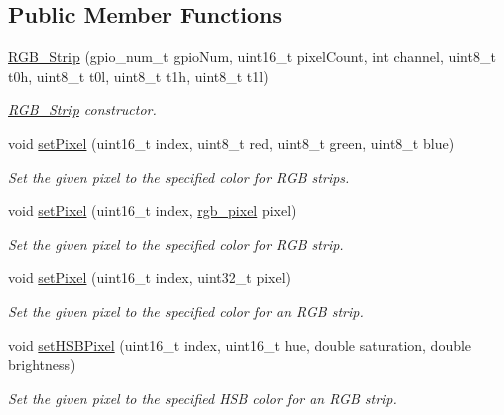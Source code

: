 \subsection*{Public Member Functions}
\begin{DoxyCompactItemize}
\item 
\mbox{\hyperlink{classRGB__Strip_a9e827e6aa443285a811a11df0b64f5aa}{R\+G\+B\+\_\+\+Strip}} (gpio\+\_\+num\+\_\+t gpio\+Num, uint16\+\_\+t pixel\+Count, int channel, uint8\+\_\+t t0h, uint8\+\_\+t t0l, uint8\+\_\+t t1h, uint8\+\_\+t t1l)
\begin{DoxyCompactList}\small\item\em \mbox{\hyperlink{classRGB__Strip}{R\+G\+B\+\_\+\+Strip}} constructor. \end{DoxyCompactList}\item 
void \mbox{\hyperlink{classRGB__Strip_ae354d178dce17ac1cfaba69e2e958130}{set\+Pixel}} (uint16\+\_\+t index, uint8\+\_\+t red, uint8\+\_\+t green, uint8\+\_\+t blue)
\begin{DoxyCompactList}\small\item\em Set the given pixel to the specified color for R\+GB strips. \end{DoxyCompactList}\item 
void \mbox{\hyperlink{classRGB__Strip_a096fbb64b7b8d79c455af1f1241e2651}{set\+Pixel}} (uint16\+\_\+t index, \mbox{\hyperlink{structrgb__pixel}{rgb\+\_\+pixel}} pixel)
\begin{DoxyCompactList}\small\item\em Set the given pixel to the specified color for R\+GB strip. \end{DoxyCompactList}\item 
void \mbox{\hyperlink{classRGB__Strip_a2364462ba0419e421b0186de56812e73}{set\+Pixel}} (uint16\+\_\+t index, uint32\+\_\+t pixel)
\begin{DoxyCompactList}\small\item\em Set the given pixel to the specified color for an R\+GB strip. \end{DoxyCompactList}\item 
void \mbox{\hyperlink{classRGB__Strip_a4f95a2aa9d7af3a68a546b54e51e27ed}{set\+H\+S\+B\+Pixel}} (uint16\+\_\+t index, uint16\+\_\+t hue, double saturation, double brightness)
\begin{DoxyCompactList}\small\item\em Set the given pixel to the specified H\+SB color for an R\+GB strip. \end{DoxyCompactList}\item 

\end{DoxyCompactItemize}

